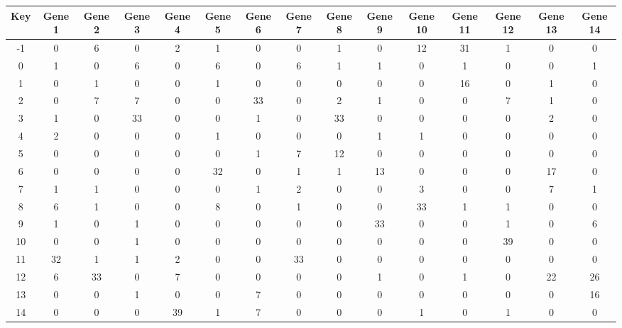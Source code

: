 \begin{tabular}{|c|c|c|c|c|c|c|c|c|c|c|c|c|c|c|}
\hline
Key & Gene 1 & Gene 2 & Gene 3 & Gene 4 & Gene 5 & Gene 6 & Gene 7 & Gene 8 & Gene 9 & Gene 10 & Gene 11 & Gene 12 & Gene 13 & Gene 14 \\
\hline
-1 & 0 & 6 & 0 & 2 & 1 & 0 & 0 & 1 & 0 & 12 & 31 & 1 & 0 & 0 \\
0 & 1 & 0 & 6 & 0 & 6 & 0 & 6 & 1 & 1 & 0 & 1 & 0 & 0 & 1 \\
1 & 0 & 1 & 0 & 0 & 1 & 0 & 0 & 0 & 0 & 0 & 16 & 0 & 1 & 0 \\
2 & 0 & 7 & 7 & 0 & 0 & 33 & 0 & 2 & 1 & 0 & 0 & 7 & 1 & 0 \\
3 & 1 & 0 & 33 & 0 & 0 & 1 & 0 & 33 & 0 & 0 & 0 & 0 & 2 & 0 \\
4 & 2 & 0 & 0 & 0 & 1 & 0 & 0 & 0 & 1 & 1 & 0 & 0 & 0 & 0 \\
5 & 0 & 0 & 0 & 0 & 0 & 1 & 7 & 12 & 0 & 0 & 0 & 0 & 0 & 0 \\
6 & 0 & 0 & 0 & 0 & 32 & 0 & 1 & 1 & 13 & 0 & 0 & 0 & 17 & 0 \\
7 & 1 & 1 & 0 & 0 & 0 & 1 & 2 & 0 & 0 & 3 & 0 & 0 & 7 & 1 \\
8 & 6 & 1 & 0 & 0 & 8 & 0 & 1 & 0 & 0 & 33 & 1 & 1 & 0 & 0 \\
9 & 1 & 0 & 1 & 0 & 0 & 0 & 0 & 0 & 33 & 0 & 0 & 1 & 0 & 6 \\
10 & 0 & 0 & 1 & 0 & 0 & 0 & 0 & 0 & 0 & 0 & 0 & 39 & 0 & 0 \\
11 & 32 & 1 & 1 & 2 & 0 & 0 & 33 & 0 & 0 & 0 & 0 & 0 & 0 & 0 \\
12 & 6 & 33 & 0 & 7 & 0 & 0 & 0 & 0 & 1 & 0 & 1 & 0 & 22 & 26 \\
13 & 0 & 0 & 1 & 0 & 0 & 7 & 0 & 0 & 0 & 0 & 0 & 0 & 0 & 16 \\
14 & 0 & 0 & 0 & 39 & 1 & 7 & 0 & 0 & 0 & 1 & 0 & 1 & 0 & 0 \\
\hline
\end{tabular}